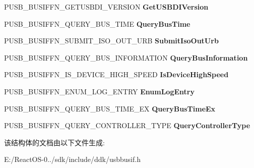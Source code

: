 \begin{DoxyCompactItemize}
P\+U\+S\+B\+\_\+\+B\+U\+S\+I\+F\+F\+N\+\_\+\+G\+E\+T\+U\+S\+B\+D\+I\+\_\+\+V\+E\+R\+S\+I\+ON {\bfseries Get\+U\+S\+B\+D\+I\+Version}
\item 
\mbox{\label{struct___u_s_b___b_u_s___i_n_t_e_r_f_a_c_e___u_s_b_d_i___v3_a56b4983512a56e312192ac0baf081d57}} 
P\+U\+S\+B\+\_\+\+B\+U\+S\+I\+F\+F\+N\+\_\+\+Q\+U\+E\+R\+Y\+\_\+\+B\+U\+S\+\_\+\+T\+I\+ME {\bfseries Query\+Bus\+Time}
\item 
\mbox{\label{struct___u_s_b___b_u_s___i_n_t_e_r_f_a_c_e___u_s_b_d_i___v3_a0c36ebc031aae23edc0ce4882b1879f7}} 
P\+U\+S\+B\+\_\+\+B\+U\+S\+I\+F\+F\+N\+\_\+\+S\+U\+B\+M\+I\+T\+\_\+\+I\+S\+O\+\_\+\+O\+U\+T\+\_\+\+U\+RB {\bfseries Submit\+Iso\+Out\+Urb}
\item 
\mbox{\label{struct___u_s_b___b_u_s___i_n_t_e_r_f_a_c_e___u_s_b_d_i___v3_aa3d70a9d6fa9cee898a9ff6083f48658}} 
P\+U\+S\+B\+\_\+\+B\+U\+S\+I\+F\+F\+N\+\_\+\+Q\+U\+E\+R\+Y\+\_\+\+B\+U\+S\+\_\+\+I\+N\+F\+O\+R\+M\+A\+T\+I\+ON {\bfseries Query\+Bus\+Information}
\item 
\mbox{\label{struct___u_s_b___b_u_s___i_n_t_e_r_f_a_c_e___u_s_b_d_i___v3_a859297e1966b0dabdae9ca568c13cca4}} 
P\+U\+S\+B\+\_\+\+B\+U\+S\+I\+F\+F\+N\+\_\+\+I\+S\+\_\+\+D\+E\+V\+I\+C\+E\+\_\+\+H\+I\+G\+H\+\_\+\+S\+P\+E\+ED {\bfseries Is\+Device\+High\+Speed}
\item 
\mbox{\label{struct___u_s_b___b_u_s___i_n_t_e_r_f_a_c_e___u_s_b_d_i___v3_ab533569cbe301cb56c7ef9f899471eaf}} 
P\+U\+S\+B\+\_\+\+B\+U\+S\+I\+F\+F\+N\+\_\+\+E\+N\+U\+M\+\_\+\+L\+O\+G\+\_\+\+E\+N\+T\+RY {\bfseries Enum\+Log\+Entry}
\item 
\mbox{\label{struct___u_s_b___b_u_s___i_n_t_e_r_f_a_c_e___u_s_b_d_i___v3_a95f53d5ed72cfa246f3fbd60b11dffd3}} 
P\+U\+S\+B\+\_\+\+B\+U\+S\+I\+F\+F\+N\+\_\+\+Q\+U\+E\+R\+Y\+\_\+\+B\+U\+S\+\_\+\+T\+I\+M\+E\+\_\+\+EX {\bfseries Query\+Bus\+Time\+Ex}
\item 
\mbox{\label{struct___u_s_b___b_u_s___i_n_t_e_r_f_a_c_e___u_s_b_d_i___v3_a2534b83468e08a2594b604052fcf429c}} 
P\+U\+S\+B\+\_\+\+B\+U\+S\+I\+F\+F\+N\+\_\+\+Q\+U\+E\+R\+Y\+\_\+\+C\+O\+N\+T\+R\+O\+L\+L\+E\+R\+\_\+\+T\+Y\+PE {\bfseries Query\+Controller\+Type}
\end{DoxyCompactItemize}


该结构体的文档由以下文件生成\+:\begin{DoxyCompactItemize}
\item 
E\+:/\+React\+O\+S-\/0../sdk/include/ddk/usbbusif.\+h\end{DoxyCompactItemize}
